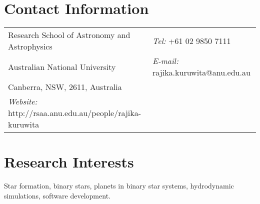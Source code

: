 \documentclass[margin,line]{res}
\begin{document}

\begin{resume}
\section{\sc Contact Information}
\vspace{.05in}
\begin{tabular}{@{}p{3in}p{4in}}
Research School of Astronomy and Astrophysics  & {\it Tel:}    +61 02 9850 7111 \\         
Australian National University & {\it E-mail:}  rajika.kuruwita@anu.edu.au\\       
Canberra, NSW, 2611, Australia  & \\
{\it Website:} http://rsaa.anu.edu.au/people/rajika-kuruwita \\     
\end{tabular}
                
\section{\sc Research Interests}
Star formation, binary stars, planets in binary star systems, hydrodynamic simulations, software development.


\end{resume}
\end{document}

